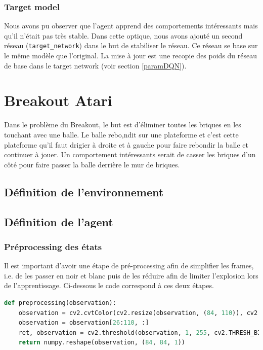 \documentclass[10pt,a4paper]{article}
\begin{document}
\subsubsection{Target model} \label{targetmodelDQN}

Nous avons pu observer que l'agent apprend des comportements intéressants mais qu'il n'était pas très stable. Dans cette optique, nous avons ajouté un second réseau (\lstinline{target_network}) dans le but de stabiliser le réseau. Ce réseau se base sur le même modèle que l'original. La mise à jour est une recopie des poids du réseau de base dans le target network (voir section \ref{paramDQN}).

\section{Breakout Atari}

Dans le problème du Breakout, le but est d'éliminer toutes les briques en les touchant avec une balle. Le balle rebo,ndit sur une plateforme et c'est cette plateforme qu'il faut drigier à droite et à gauche pour faire rebondir la balle et continuer à jouer. Un comportement intéressants serait de casser les briques d'un côté pour faire passer la balle derrière le mur de briques. 

\subsection{Définition de l'environnement}

\subsection{Définition de l'agent}

\subsubsection{Préprocessing des états}

Il est important d'avoir une étape de pré-processing afin de \og simplifier \fg{} les frames, i.e. de les passer en noir et blanc puis de les réduire afin de limiter l'explosion lors de l'apprentissage. Ci-dessous le code correspond à ces deux étapes.

\begin{lstlisting}[language=Python,caption=Préprocessing des états]
def preprocessing(observation):
    observation = cv2.cvtColor(cv2.resize(observation, (84, 110)), cv2.COLOR_BGR2GRAY)
    observation = observation[26:110, :]
    ret, observation = cv2.threshold(observation, 1, 255, cv2.THRESH_BINARY)
    return numpy.reshape(observation, (84, 84, 1))
\end{lstlisting}
\end{document}
